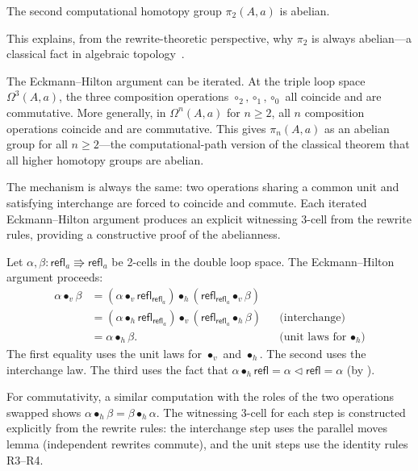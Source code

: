 \documentclass[manuscript]{BSLstyle}
\newcommand{\refl}{\mathsf{refl}}
\begin{document}
\begin{corollary}\label{cor:pi2-abelian}
The second computational homotopy group $\pi_2(A, a)$ is abelian.
\end{corollary}

\noindent
This explains, from the rewrite-theoretic perspective, why $\pi_2$ is
always abelian---a classical fact in algebraic
topology~\cite{Hatcher02,May99}.

\begin{remark}
The Eckmann--Hilton argument can be iterated.  At the triple loop space
$\Omega^3(A, a)$, the three composition operations $\circ_2, \circ_1, \circ_0$
all coincide and are commutative.  More generally, in $\Omega^n(A, a)$
for $n \geq 2$, all $n$ composition operations coincide and are
commutative.  This gives $\pi_n(A, a)$ as an abelian group for all
$n \geq 2$---the computational-path version of the classical theorem
that all higher homotopy groups are abelian.

The mechanism is always the same: two operations sharing a common unit
and satisfying interchange are forced to coincide and commute.
Each iterated Eckmann--Hilton argument produces an explicit witnessing
3-cell from the rewrite rules, providing a constructive proof of the
abelianness.
\end{remark}

\begin{example}\label{ex:eh-detail}
Let $\alpha, \beta : \refl_a \Rrightarrow \refl_a$ be 2-cells in the
double loop space.  The Eckmann--Hilton argument proceeds:
\begin{align*}
\alpha \bullet_v \beta
&= (\alpha \bullet_v \refl_{\refl_a}) \bullet_h
   (\refl_{\refl_a} \bullet_v \beta) \\
&= (\alpha \bullet_h \refl_{\refl_a}) \bullet_v
   (\refl_{\refl_a} \bullet_h \beta)
   && \text{(interchange)} \\
&= \alpha \bullet_h \beta.
   && \text{(unit laws for $\bullet_h$)}
\end{align*}
The first equality uses the unit laws for $\bullet_v$ and $\bullet_h$.
The second uses the interchange law.  The third uses the fact that
$\alpha \bullet_h \refl = \alpha \triangleleft \refl = \alpha$
(by ).

For commutativity, a similar computation with the roles of the two
operations swapped shows $\alpha \bullet_h \beta = \beta \bullet_h \alpha$.
The witnessing 3-cell for each step is constructed explicitly from the
rewrite rules: the interchange step uses the parallel moves lemma
(independent rewrites commute), and the unit steps use the identity
rules R3--R4.
\end{example}
\end{document}
